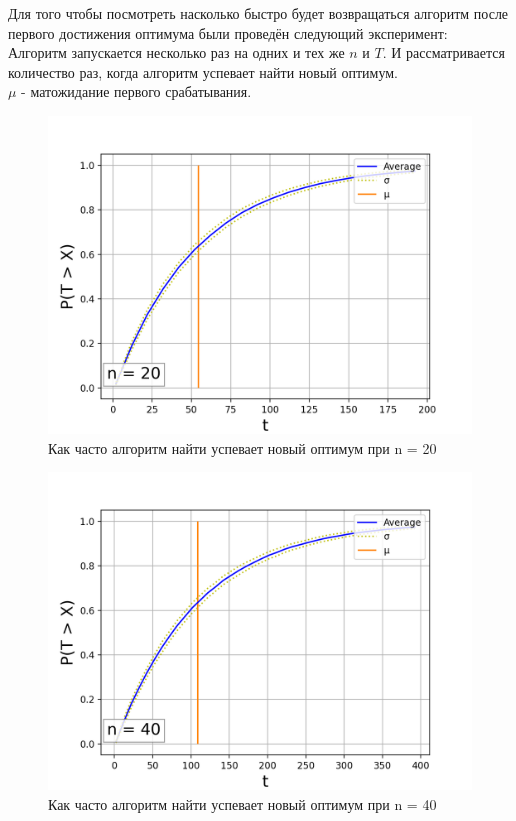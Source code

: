 \documentclass[times,specification,annotation]{itmo-student-thesis}
\begin{document}
    Для того чтобы посмотреть насколько быстро будет возвращаться алгоритм после первого достижения оптимума были проведён следующий эксперимент: \\
    Алгоритм запускается несколько раз на одних и тех же $n$ и $T$.
    И рассматривается количество раз, когда алгоритм успевает найти новый оптимум. \\
    $\mu$ - матожидание первого срабатывания. \\
    \begin{figure}[H]
        \centering
        \caption{Как часто алгоритм найти успевает новый оптимум при n = 20}
        \label{pic:sublists-metafile}
        \includegraphics[scale=0.8]{plot_T_bigger_X_20.png}
    \end{figure}

    \begin{figure}[H]
        \centering
        \caption{Как часто алгоритм найти успевает новый оптимум при n = 40}
        \label{pic:sublists-metafile}
        \includegraphics[scale=0.8]{plot_T_bigger_X_40.png}
    \end{figure}
\end{document}
